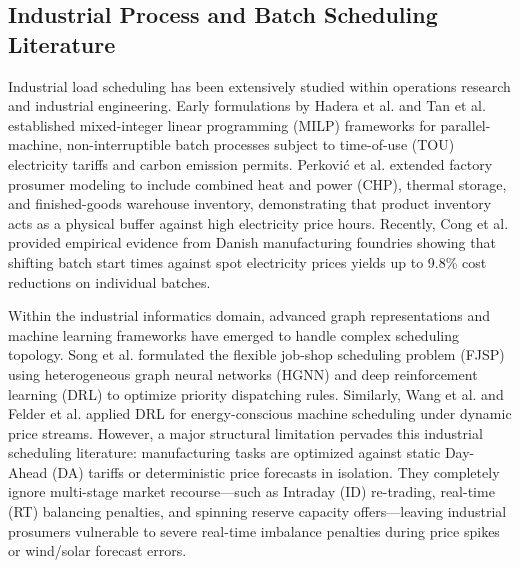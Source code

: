 \documentclass[journal]{IEEEtran}
\begin{document}
\subsection{Industrial Process and Batch Scheduling Literature}
Industrial load scheduling has been extensively studied within operations research and industrial engineering. Early formulations by Hadera et al. \cite{hadera2015} and Tan et al. \cite{tan2019} established mixed-integer linear programming (MILP) frameworks for parallel-machine, non-interruptible batch processes subject to time-of-use (TOU) electricity tariffs and carbon emission permits. Perkovi{\'c} et al. \cite{perkovic2017} extended factory prosumer modeling to include combined heat and power (CHP), thermal storage, and finished-goods warehouse inventory, demonstrating that product inventory acts as a physical buffer against high electricity price hours. Recently, Cong et al. \cite{cong2025} provided empirical evidence from Danish manufacturing foundries showing that shifting batch start times against spot electricity prices yields up to 9.8\% cost reductions on individual batches. 

Within the industrial informatics domain, advanced graph representations and machine learning frameworks have emerged to handle complex scheduling topology. Song et al. \cite{song2022} formulated the flexible job-shop scheduling problem (FJSP) using heterogeneous graph neural networks (HGNN) and deep reinforcement learning (DRL) to optimize priority dispatching rules. Similarly, Wang et al. \cite{wang2025} and Felder et al. \cite{felder2023} applied DRL for energy-conscious machine scheduling under dynamic price streams. However, a major structural limitation pervades this industrial scheduling literature: manufacturing tasks are optimized against static Day-Ahead (DA) tariffs or deterministic price forecasts in isolation. They completely ignore multi-stage market recourse—such as Intraday (ID) re-trading, real-time (RT) balancing penalties, and spinning reserve capacity offers—leaving industrial prosumers vulnerable to severe real-time imbalance penalties during price spikes or wind/solar forecast errors.
\end{document}

